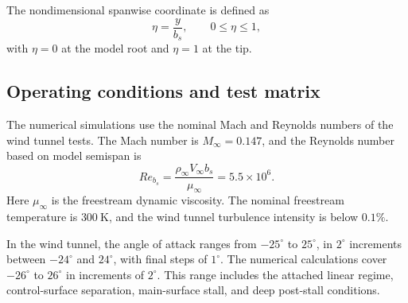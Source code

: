 \documentclass[journal ]{new-aiaa}
\begin{document}
The nondimensional spanwise coordinate is defined as
%
\begin{equation}
\eta = \frac{y}{b_s},
\qquad
0 \leq \eta \leq 1,
\label{eq:span_coordinate}
\end{equation}
%
with $\eta=0$ at the model root and $\eta=1$ at the tip.





\subsection{Operating conditions and test matrix}
\label{sec:operating_conditions}

The numerical simulations use the nominal Mach and Reynolds numbers of the wind tunnel tests.
The Mach number is $M_\infty=0.147$, and the Reynolds number based on model semispan is
%
\begin{equation}
Re_{b_s}
=
\frac{\rho_\infty V_\infty b_s}
{\mu_\infty}
=
5.5\times10^6.
\label{eq:reynolds}
\end{equation}
%
Here $\mu_\infty$ is the freestream dynamic viscosity. The nominal freestream temperature is $300~\mathrm{K}$, and the wind tunnel turbulence intensity is below $0.1\%$.

In the wind tunnel, the angle of attack ranges from $-25^\circ$ to $25^\circ$, in $2^\circ$ increments between $-24^\circ$ and $24^\circ$, with final steps of $1^\circ$. The numerical calculations cover $-26^\circ$ to $26^\circ$ in increments of $2^\circ$. This range includes the attached linear regime, control-surface separation, main-surface stall, and deep post-stall conditions. 

\end{document}
